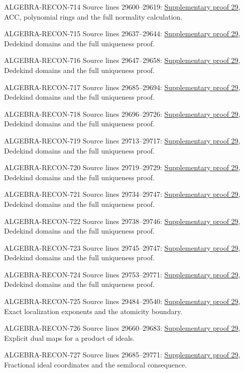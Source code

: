 \begin{AlgebraSourceRoutes}
\item[ALGEBRA-RECON-714] Source lines 29600--29619: \hyperlink{algebra_factorization_notes_20260928}{Supplementary proof 29}, ACC, polynomial rings and the full normality calculation.
\item[ALGEBRA-RECON-715] Source lines 29637--29644: \hyperlink{algebra_factorization_notes_20260928}{Supplementary proof 29}, Dedekind domains and the full uniqueness proof.
\item[ALGEBRA-RECON-716] Source lines 29647--29658: \hyperlink{algebra_factorization_notes_20260928}{Supplementary proof 29}, Dedekind domains and the full uniqueness proof.
\item[ALGEBRA-RECON-717] Source lines 29685--29694: \hyperlink{algebra_factorization_notes_20260928}{Supplementary proof 29}, Dedekind domains and the full uniqueness proof.
\item[ALGEBRA-RECON-718] Source lines 29696--29726: \hyperlink{algebra_factorization_notes_20260928}{Supplementary proof 29}, Dedekind domains and the full uniqueness proof.
\item[ALGEBRA-RECON-719] Source lines 29713--29717: \hyperlink{algebra_factorization_notes_20260928}{Supplementary proof 29}, Dedekind domains and the full uniqueness proof.
\item[ALGEBRA-RECON-720] Source lines 29719--29729: \hyperlink{algebra_factorization_notes_20260928}{Supplementary proof 29}, Dedekind domains and the full uniqueness proof.
\item[ALGEBRA-RECON-721] Source lines 29734--29747: \hyperlink{algebra_factorization_notes_20260928}{Supplementary proof 29}, Dedekind domains and the full uniqueness proof.
\item[ALGEBRA-RECON-722] Source lines 29738--29746: \hyperlink{algebra_factorization_notes_20260928}{Supplementary proof 29}, Dedekind domains and the full uniqueness proof.
\item[ALGEBRA-RECON-723] Source lines 29745--29747: \hyperlink{algebra_factorization_notes_20260928}{Supplementary proof 29}, Dedekind domains and the full uniqueness proof.
\item[ALGEBRA-RECON-724] Source lines 29753--29771: \hyperlink{algebra_factorization_notes_20260928}{Supplementary proof 29}, Dedekind domains and the full uniqueness proof.
\item[ALGEBRA-RECON-725] Source lines 29484--29540: \hyperlink{algebra_factorization_notes_20260928}{Supplementary proof 29}, Exact localization exponents and the atomicity boundary.
\item[ALGEBRA-RECON-726] Source lines 29660--29683: \hyperlink{algebra_factorization_notes_20260928}{Supplementary proof 29}, Explicit dual maps for a product of ideals.
\item[ALGEBRA-RECON-727] Source lines 29685--29771: \hyperlink{algebra_factorization_notes_20260928}{Supplementary proof 29}, Fractional ideal coordinates and the semilocal consequence.
\end{AlgebraSourceRoutes}

